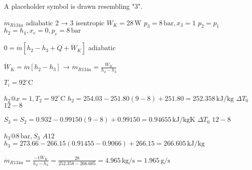 A placeholder symbol is drawn resembling "3".

\( \dot{m}_{R134a} \) adiabatic  
2 → 3 isentropic \( W_K = 28 \, \text{W} \)  
\( p_3 = 8 \, \text{bar}, x_3 = 1 \)  
\( p_2 = p_1 \)  
\( h_2 = h_4, x_e = 0, p_e = 8 \, \text{bar} \)  

\( 0 = \dot{m} [h_2 - h_3 + \dot{Q} + \dot{W}_K] \)  
adiabatic  

\( \dot{W}_K = \dot{m} [h_2 - h_3] \)  
→ \( \dot{m}_{R134a} = \frac{\dot{W}_K}{h_2 - h_3} \)  

\( T_i = 92^\circ \text{C} \)  

\( h_2 @ x = 1, T_2 = 92^\circ \text{C} \)  
\( h_2 = 254.03 - 251.80 (9 - 8) + 251.80 = 252.358 \, \text{kJ/kg} \)  
\( \Delta T_0 \)  
\( 12 - 8 \)  

\( S_3 = S_2 = 0.932 - 0.99150 (9 - 8) + 0.99150 = 0.94655 \, \text{kJ/kgK} \)  
\( \Delta T_0 \)  
\( 12 - 8 \)  

\( h_3 @ 8 \, \text{bar}, S_3 \)  
\( A12 \)  
\( h_3 = 273.66 - 266.15 (0.91455 - 0.9066) + 266.15 = 266.605 \, \text{kJ/kg} \)  

\( \dot{m}_{R134a} = \frac{-1 \dot{W}_K}{h_2 - h_3} = \frac{28}{252.358 - 266.605} = 4.965 \, \text{kg/s} = 1.965 \, \text{g/s} \)